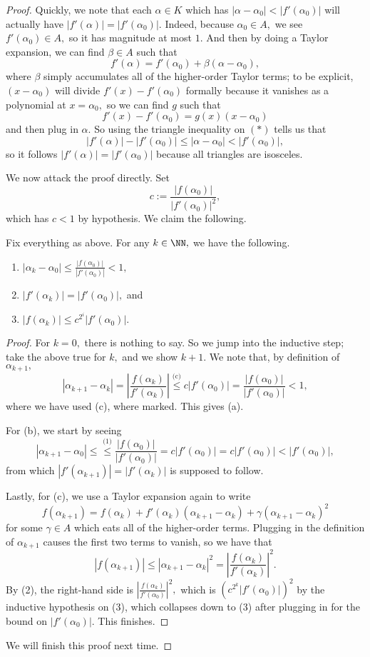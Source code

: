 \documentclass[../notes.tex]{subfiles}
\begin{document}
\begin{proof}
	Quickly, we note that each $\alpha\in K$ which has $|\alpha-\alpha_0|<|f'(\alpha_0)|$ will actually have $|f'(\alpha)|=|f'(\alpha_0)|.$ Indeed, because $\alpha_0\in A,$ we see $f'(\alpha_0)\in A,$ so it has magnitude at most $1.$ And then by doing a Taylor expansion, we can find $\beta\in A$ such that
	\[f'(\alpha)=f'(\alpha_0)+\beta(\alpha-\alpha_0),\tag{$*$}\]
	where $\beta$ simply accumulates all of the higher-order Taylor terms; to be explicit, $(x-\alpha_0)$ will divide $f'(x)-f'(\alpha_0)$ formally because it vanishes as a polynomial at $x=\alpha_0,$ so we can find $g$ such that
	\[f'(x)-f'(\alpha_0)=g(x)(x-\alpha_0)\]
	and then plug in $\alpha.$ So using the triangle inequality on $(*)$ tells us that
	\[|f'(\alpha)|-|f'(\alpha_0)|\le|\alpha-\alpha_0|<|f'(\alpha_0)|,\]
	so it follows $|f'(\alpha)|=|f'(\alpha_0)|$ because all triangles are isosceles.

	We now attack the proof directly. Set
	\[c:=\frac{|f(\alpha_0)|}{|f'(\alpha_0)|^2},\]
	which has $c<1$ by hypothesis. We claim the following.
	\begin{lemma}
		Fix everything as above. For any $k\in\NN,$ we have the following.
		\begin{enumerate}[label=(\alph*)]
			\item $|\alpha_k-\alpha_0|\le\frac{|f(\alpha_0)|}{|f'(\alpha_0)|}<1,$
			\item $|f'(\alpha_k)|=|f'(\alpha_0)|,$ and
			\item $|f(\alpha_k)|\le c^{2^i}|f'(\alpha_0)|.$
		\end{enumerate}
	\end{lemma}
	\begin{proof}
		For $k=0,$ there is nothing to say. So we jump into the inductive step; take the above true for $k,$ and we show $k+1.$ We note that, by definition of $\alpha_{k+1},$
		\[|\alpha_{k+1}-\alpha_k|=\left|\frac{f(\alpha_k)}{f'(\alpha_k)}\right|\stackrel{\text{(c)}}\le c|f'(\alpha_0)|=\frac{|f(\alpha_0)|}{|f'(\alpha_0)|}<1,\]
		where we have used (c), where marked. This gives (a).

		For (b), we start by seeing
		\[|\alpha_{k+1}-\alpha_0|\le\stackrel{\text{(1)}}\le\frac{|f(\alpha_0)|}{|f'(\alpha_0)|}=c|f'(\alpha_0)|=c|f'(\alpha_0)|<|f'(\alpha_0)|,\]
		from which $|f'(\alpha_{k+1})|=|f'(\alpha_k)|$ is supposed to follow.

		Lastly, for (c), we use a Taylor expansion again to write
		\[f(\alpha_{k+1})=f(\alpha_k)+f'(\alpha_k)(\alpha_{k+1}-\alpha_k)+\gamma(\alpha_{k+1}-\alpha_k)^2\]
		for some $\gamma\in A$ which eats all of the higher-order terms. Plugging in the definition of $\alpha_{k+1}$ causes the first two terms to vanish, so we have that
		\[|f(\alpha_{k+1})|\le|\alpha_{k+1}-\alpha_k|^2=\left|\frac{f(\alpha_k)}{f'(\alpha_k)}\right|^2.\]
		By (2), the right-hand side is $\left|\frac{f(\alpha_k)}{f'(\alpha_0)}\right|^2,$ which is $\left(c^{2^k}|f'(\alpha_0)|\right)^2$ by the inductive hypothesis on (3), which collapses down to (3) after plugging in for the bound on $|f'(\alpha_0)|.$ This finishes.
		\qedhere
	\end{proof}
	We will finish this proof next time.
\end{proof}
\end{document}
